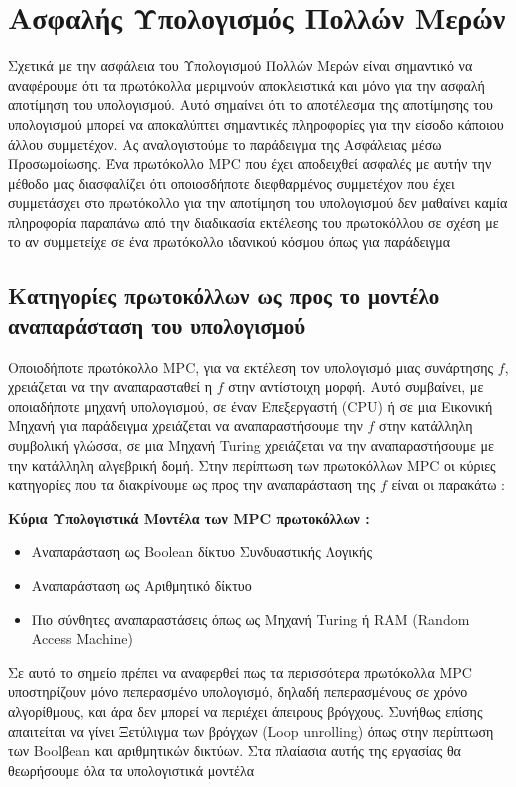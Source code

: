 \chapter{Ασφαλής Υπολογισμός Πολλών Μερών}
\label{chapter:SMPC}
Σχετικά με την ασφάλεια του Υπολογισμού Πολλών Μερών είναι σημαντικό να αναφέρουμε ότι τα πρωτόκολλα μεριμνούν αποκλειστικά και μόνο για την ασφαλή αποτίμηση του υπολογισμού. Αυτό σημαίνει ότι το αποτέλεσμα της αποτίμησης του υπολογισμού μπορεί να αποκαλύπτει σημαντικές πληροφορίες για την είσοδο κάποιου άλλου συμμετέχον. Ας αναλογιστούμε το παράδειγμα της Ασφάλειας μέσω Προσωμοίωσης. Ένα πρωτόκολλο MPC που έχει αποδειχθεί ασφαλές με αυτήν την μέθοδο μας διασφαλίζει ότι οποιοσδήποτε διεφθαρμένος συμμετέχον που έχει συμμετάσχει στο πρωτόκολλο για την αποτίμηση του υπολογισμού δεν μαθαίνει καμία πληροφορία παραπάνω από την διαδικασία εκτέλεσης του πρωτοκόλλου σε σχέση με το αν συμμετείχε σε ένα πρωτόκολλο ιδανικού κόσμου όπως για παράδειγμα

\cite{10.1561/3300000019}
\section{Κατηγορίες πρωτοκόλλων ως προς το μοντέλο αναπαράσταση του υπολογισμού}

Οποιοδήποτε πρωτόκολλο MPC, για να εκτέλεση τον υπολογισμό μιας συνάρτησης $f$, χρειάζεται να την αναπαρασταθεί η $f$ στην αντίστοιχη μορφή. Αυτό συμβαίνει, με οποιαδήποτε μηχανή υπολογισμού, σε έναν Επεξεργαστή (CPU) ή σε μια Εικονική Μηχανή για παράδειγμα χρειάζεται να αναπαραστήσουμε την $f$ στην κατάλληλη συμβολική γλώσσα, σε μια Μηχανή Turing χρειάζεται να την αναπαραστήσουμε με την κατάλληλη αλγεβρική δομή. Στην περίπτωση των πρωτοκόλλων MPC οι κύριες κατηγορίες που τα διακρίνουμε ως προς την αναπαράσταση της $f$ είναι οι παρακάτω :

\begin{definition}
\textbf{Κύρια Υπολογιστικά Μοντέλα των MPC πρωτοκόλλων :}
\begin{itemize}
    \item Αναπαράσταση ως Boolean δίκτυο Συνδυαστικής Λογικής
    \item Αναπαράσταση ως Αριθμητικό δίκτυο
    \item Πιο σύνθητες αναπαραστάσεις όπως ως Μηχανή Turing ή RAM (Random Access Machine)
\end{itemize}
\end{definition}

Σε αυτό το σημείο πρέπει να αναφερθεί πως τα περισσότερα πρωτόκολλα MPC υποστηρίζουν μόνο πεπερασμένο υπολογισμό, δηλαδή πεπερασμένους σε χρόνο αλγορίθμους, και άρα δεν μπορεί να περιέχει άπειρους βρόγχους. Συνήθως επίσης απαιτείται να γίνει Ξετύλιγμα των βρόγχων (Loop unrolling) όπως στην περίπτωση των Boolβean και αριθμητικών δικτύων. Στα πλαίασια αυτής της εργασίας θα θεωρήσουμε όλα τα υπολογιστικά μοντέλα

